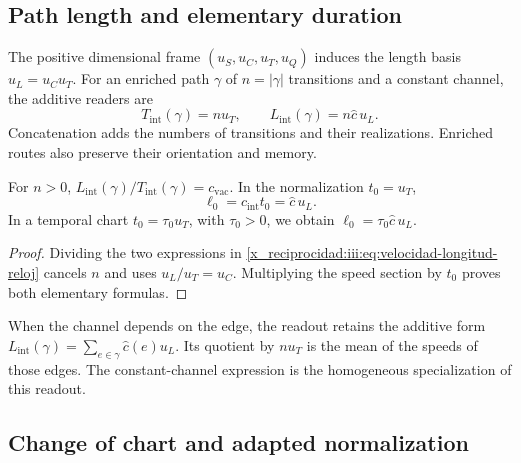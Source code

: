 \subsection{Path length and elementary duration}

The positive dimensional frame $(u_S,u_C,u_T,u_Q)$ induces the length
basis $u_L=u_Cu_T$. For an enriched path $\gamma$ of
$n=|\gamma|$ transitions and a constant channel, the additive readers are
\begin{equation}
 T_{\mathrm{int}}(\gamma)=nu_T,
 \qquad L_{\mathrm{int}}(\gamma)=n\widehat c\,u_L.
 \label{x_reciprocidad:iii:eq:velocidad-longitud-reloj}
\end{equation}
Concatenation adds the numbers of transitions and their realizations.
Enriched routes also preserve their orientation and memory.

\begin{corollary}
For $n>0$, $L_{\mathrm{int}}(\gamma)/T_{\mathrm{int}}(\gamma)
=c_{\mathrm{vac}}$. In the normalization $t_0=u_T$,
\begin{equation}
 \ell_0=c_{\mathrm{int}}t_0=\widehat c\,u_L.
 \label{x_reciprocidad:iii:eq:longitud-elemental-constitutiva}
\end{equation}
In a temporal chart $t_0=\tau_0u_T$, with $\tau_0>0$, we obtain
$\ell_0=\tau_0\widehat c\,u_L$.
\end{corollary}
\begin{proof}
Dividing the two expressions in \eqref{x_reciprocidad:iii:eq:velocidad-longitud-reloj}
cancels $n$ and uses $u_L/u_T=u_C$. Multiplying the speed section
by $t_0$ proves both elementary formulas.
\end{proof}

When the channel depends on the edge, the readout retains the additive form
$L_{\mathrm{int}}(\gamma)=\sum_{e\in\gamma}\widehat c(e)u_L$.
Its quotient by $nu_T$ is the mean of the speeds of those edges.
The constant-channel expression is the homogeneous specialization of
this readout.

\subsection{Change of chart and adapted normalization}

